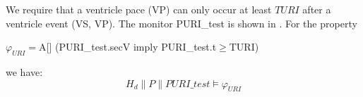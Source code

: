 We require that a ventricle pace (VP) can only occur at least $TURI$ after a ventricle event (VS, VP). The monitor \textsf{PURI\_test} is shown in . For the property
\begin{center}
$\varphi_{URI}=$\textsf{A[] (PURI\_test.secV imply PURI\_test.t$\geq$TURI)}
\end{center}
we have: $$H_d\| P\| PURI\_test\models \varphi_{URI}$$

%
%
%
%
%
%


